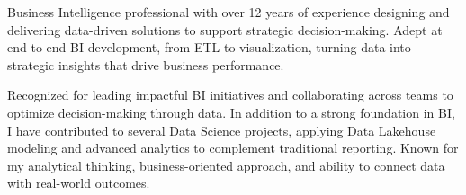 

\begin{cvparagraph}

Business Intelligence professional with over 12 years of experience designing and delivering data-driven solutions to support strategic decision-making. Adept at end-to-end BI development, from ETL to visualization, turning data into strategic insights that drive business performance. 

Recognized for leading impactful BI initiatives and collaborating across teams to optimize decision-making through data. In addition to a strong foundation in BI, I have contributed to several Data Science projects, applying Data Lakehouse modeling and advanced analytics to complement traditional reporting. Known for my analytical thinking, business-oriented approach, and ability to connect data with real-world outcomes.

\end{cvparagraph}
